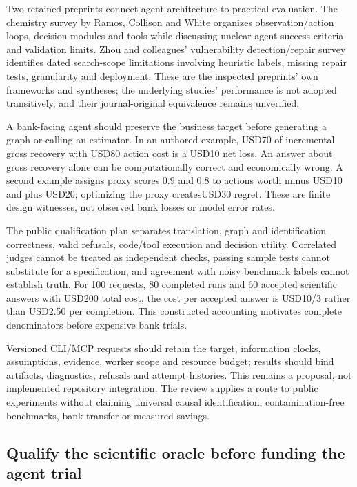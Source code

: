 Two retained preprints connect agent architecture to practical
evaluation. The chemistry survey by Ramos, Collison and White organizes
observation/action loops, decision modules and tools while discussing
unclear agent success criteria and validation limits. Zhou and
colleagues' vulnerability detection/repair survey identifies dated
search-scope limitations involving heuristic labels, missing repair
tests, granularity and deployment. These are the inspected preprints'
own frameworks and syntheses; the underlying studies' performance is not
adopted transitively, and their journal-original equivalence remains
unverified. \citep{exec25_cow_chemistry,exec25_cow_vulnerability}

A bank-facing agent should preserve the business target before
generating a graph or calling an estimator. In an authored example,
USD70 of incremental gross recovery with USD80 action cost is a USD10
net loss. An answer about gross recovery alone can be computationally
correct and economically wrong. A second example assigns proxy scores
0.9 and 0.8 to actions worth minus USD10 and plus USD20; optimizing the
proxy createsUSD30 regret. These are finite design witnesses, not
observed bank losses or model error rates. \citep{exec25_cow_reference}

The public qualification plan separates translation, graph and
identification correctness, valid refusals, code/tool execution and
decision utility. Correlated judges cannot be treated as independent
checks, passing sample tests cannot substitute for a specification, and
agreement with noisy benchmark labels cannot establish truth. For 100
requests, 80 completed runs and 60 accepted scientific answers with
USD200 total cost, the cost per accepted answer is USD10/3 rather than
USD2.50 per completion. This constructed accounting motivates complete
denominators before expensive bank trials. \citep{exec25_cow_reference}

Versioned CLI/MCP requests should retain the target, information clocks,
assumptions, evidence, worker scope and resource budget; results should
bind artifacts, diagnostics, refusals and attempt histories. This
remains a proposal, not implemented repository integration. The review
supplies a route to public experiments without claiming universal causal
identification, contamination-free benchmarks, bank transfer or measured
savings. \citep{exec25_cow_reference}

\hypertarget{qualify-the-scientific-oracle-before-funding-the-agent-trial}{%
\subsection{Qualify the scientific oracle before funding the agent
trial}\label{qualify-the-scientific-oracle-before-funding-the-agent-trial}}


